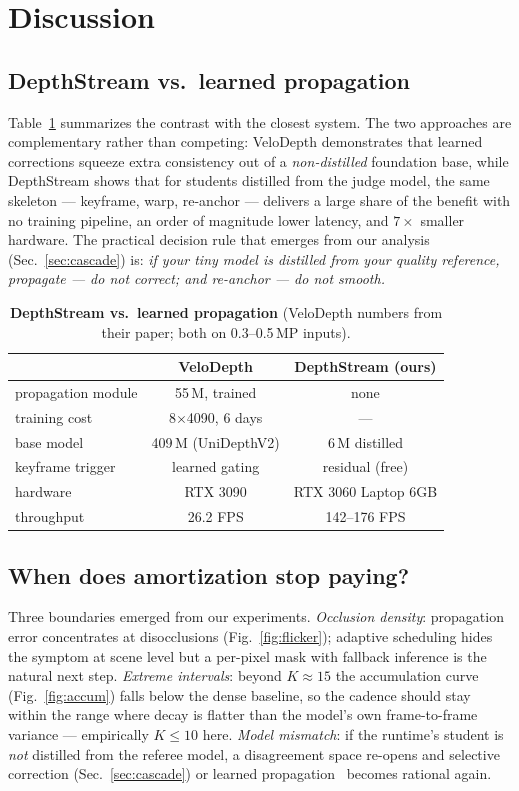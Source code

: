 \documentclass[10pt,twocolumn]{article}
\begin{document}
\section{Discussion}
\label{sec:discussion}

\subsection{DepthStream vs.\ learned propagation}
Table~\ref{tab:velodepth} summarizes the contrast with the closest system.
The two approaches are complementary rather than competing: VeloDepth
demonstrates that learned corrections squeeze extra consistency out of a
\emph{non-distilled} foundation base, while DepthStream shows that for
students distilled from the judge model, the same skeleton --- keyframe,
warp, re-anchor --- delivers a large share of the benefit with no training
pipeline, an order of magnitude lower latency, and $7\times$ smaller
hardware. The practical decision rule that emerges from our analysis
(Sec.~\ref{sec:cascade}) is: \emph{if your tiny model is distilled from your
quality reference, propagate --- do not correct; and re-anchor --- do not
smooth.}

\begin{table}[t]
\centering\small
\caption{\textbf{DepthStream vs.\ learned propagation} (VeloDepth numbers
from their paper; both on 0.3--0.5\,MP inputs).}
\label{tab:velodepth}
\begin{tabular}{lcc}
\toprule
 & VeloDepth & DepthStream (ours)\\
\midrule
propagation module & 55\,M, trained & none\\
training cost & 8$\times$4090, 6 days & ---\\
base model & 409\,M (UniDepthV2) & 6\,M distilled\\
keyframe trigger & learned gating & residual (free)\\
hardware & RTX 3090 & RTX 3060 Laptop 6GB\\
throughput & 26.2 FPS & 142--176 FPS\\
\bottomrule
\end{tabular}
\end{table}

\subsection{When does amortization stop paying?}
Three boundaries emerged from our experiments. \emph{Occlusion density}:
propagation error concentrates at disocclusions (Fig.~\ref{fig:flicker});
adaptive scheduling hides the symptom at scene level but a per-pixel mask
with fallback inference is the natural next step. \emph{Extreme intervals}:
beyond $K{\approx}15$ the accumulation curve (Fig.~\ref{fig:accum}) falls
below the dense baseline, so the cadence should stay within the range where
decay is flatter than the model's own frame-to-frame variance ---
empirically $K{\leq}10$ here. \emph{Model mismatch}: if the runtime's
student is \emph{not} distilled from the referee model, a disagreement
space re-opens and selective correction (Sec.~\ref{sec:cascade}) or learned
propagation~\cite{velodepth} becomes rational again.
\end{document}
